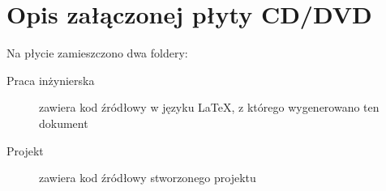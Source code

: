 \chapter{Opis załączonej płyty CD/DVD}
Na płycie zamieszczono dwa foldery:
\begin{description}
	\item[Praca inżynierska] zawiera kod źródłowy w języku LaTeX, z którego wygenerowano ten dokument
	\item[Projekt] zawiera kod źródłowy stworzonego projektu
\end{description}